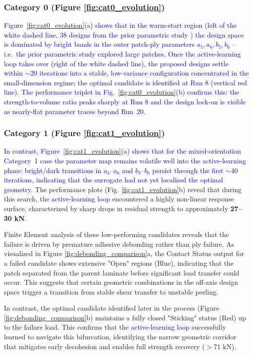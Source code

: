 \documentclass[
  preprint,
  12pt,
  a4paper
]{elsarticle}
\newcommand{\new}[1]{\textcolor{blue}{#1}}
\begin{document}
\subsubsection{Category 0 (Figure \ref{fig:cat0_evolution})}
\new{Figure~\ref{fig:cat0_evolution}(a) shows that in the warm-start region (left of the white dashed line, 38 designs from the prior parametric study \cite{psarras2024design}) the design space is dominated by bright bands in the outer patch-ply parameters $a_5, a_6, b_5, b_6$ -- i.e.\ the prior parametric study explored large patches. Once the active-learning loop takes over (right of the white dashed line), the proposed designs settle within $\sim$20 iterations into a stable, low-variance configuration concentrated in the small-dimension regime; the optimal candidate is identified at Run 8 (vertical red line). The performance triplet in Fig.~\ref{fig:cat0_evolution}(b) confirms this: the strength-to-volume ratio peaks sharply at Run 8 and the design lock-on is visible as nearly-flat parameter traces beyond Run~20.}

\subsubsection{Category 1 (Figure \ref{fig:cat1_evolution})}
\new{In contrast, Figure~\ref{fig:cat1_evolution}(a) shows that for the mixed-orientation Category~1 case the parameter map remains volatile well into the active-learning phase: bright/dark transitions in $a_3$--$a_6$ and $b_3$--$b_6$ persist through the first $\sim$40 iterations, indicating that the surrogate had not yet localised the optimal geometry.} The performance plots (Fig. \ref{fig:cat1_evolution}b) reveal that during this search, the \new{active-learning loop} encountered a highly non-linear response surface, characterized by sharp drops in residual strength to approximately \textbf{27--30 kN}.

Finite Element analysis of these low-performing candidates reveals that the failure is driven by premature adhesive debonding rather than ply failure. As visualized in Figure \ref{fig:debonding_comparison}a, the Contact Status output for a failed candidate shows extensive "Open" regions (Blue), indicating that the patch separated from the parent laminate before significant load transfer could occur. This suggests that certain geometric combinations in the off-axis design space trigger a transition from stable shear transfer to unstable peeling. 

In contrast, the optimal candidate identified later in the process (Figure \ref{fig:debonding_comparison}b) maintains a fully closed "Sticking" status (Red) up to the failure load. This confirms that the \new{active-learning loop} successfully learned to navigate this bifurcation, identifying the narrow geometric corridor that mitigates early decohesion and enables full strength recovery ($>71$ kN).
\end{document}
